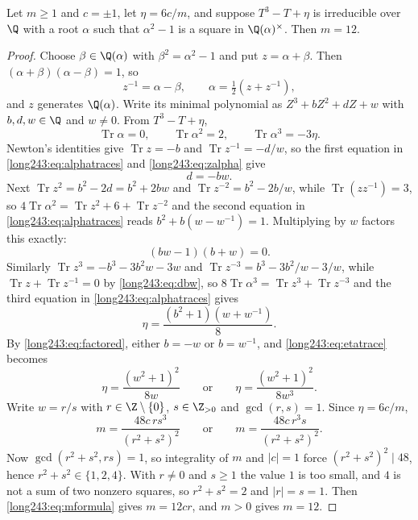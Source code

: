 \documentclass[11pt]{article}
\DeclareMathOperator{\Tr}{Tr}
\begin{document}
\begin{lemma}\label{long243:res:scaletwelve}
Let $m\ge1$ and $c=\pm1$, let $\eta=6c/m$, and suppose $T^3-T+\eta$ is
irreducible over $\Q$ with a root $\alpha$ such that $\alpha^2-1$ is a square
in $\Q(\alpha)^\times$.  Then $m=12$.
\end{lemma}

\begin{proof}
Choose $\beta\in\Q(\alpha)$ with $\beta^2=\alpha^2-1$ and put $z=\alpha+\beta$.
Then $(\alpha+\beta)(\alpha-\beta)=1$, so
\begin{equation}\label{long243:eq:zalpha}
 z^{-1}=\alpha-\beta,\qquad \alpha=\tfrac12(z+z^{-1}),
\end{equation}
and $z$ generates $\Q(\alpha)$.  Write its minimal polynomial as
$Z^3+bZ^2+dZ+w$ with $b,d,w\in\Q$ and $w\ne0$.  From $T^3-T+\eta$,
\begin{equation}\label{long243:eq:alphatraces}
 \Tr\alpha=0,\qquad \Tr\alpha^2=2,\qquad \Tr\alpha^3=-3\eta .
\end{equation}
Newton's identities give $\Tr z=-b$ and $\Tr z^{-1}=-d/w$, so the first
equation in \eqref{long243:eq:alphatraces} and \eqref{long243:eq:zalpha} give
\begin{equation}\label{long243:eq:dbw}
 d=-bw .
\end{equation}
Next $\Tr z^2=b^2-2d=b^2+2bw$ and $\Tr z^{-2}=b^2-2b/w$, while
$\Tr(zz^{-1})=3$, so $4\Tr\alpha^2=\Tr z^2+6+\Tr z^{-2}$ and the second
equation in \eqref{long243:eq:alphatraces} reads $b^2+b(w-w^{-1})=1$.  Multiplying by
$w$ factors this exactly:
\begin{equation}\label{long243:eq:factored}
 (bw-1)(b+w)=0 .
\end{equation}
Similarly $\Tr z^3=-b^3-3b^2w-3w$ and $\Tr z^{-3}=b^3-3b^2/w-3/w$, while
$\Tr z+\Tr z^{-1}=0$ by \eqref{long243:eq:dbw}, so
$8\Tr\alpha^3=\Tr z^3+\Tr z^{-3}$ and the third equation in
\eqref{long243:eq:alphatraces} gives
\begin{equation}\label{long243:eq:etatrace}
 \eta=\frac{(b^2+1)(w+w^{-1})}8 .
\end{equation}
By \eqref{long243:eq:factored}, either $b=-w$ or $b=w^{-1}$, and \eqref{long243:eq:etatrace}
becomes
\[
 \eta=\frac{(w^2+1)^2}{8w}
 \qquad\text{or}\qquad
 \eta=\frac{(w^2+1)^2}{8w^3}.
\]
Write $w=r/s$ with $r\in\Z\mathbin{\backslash}\{0\}$, $s\in\Z_{>0}$ and $\gcd(r,s)=1$.
Since $\eta=6c/m$,
\begin{equation}\label{long243:eq:mformula}
 m=\frac{48c\,rs^3}{(r^2+s^2)^2}
 \qquad\text{or}\qquad
 m=\frac{48c\,r^3s}{(r^2+s^2)^2}.
\end{equation}
Now $\gcd(r^2+s^2,rs)=1$, so integrality of $m$ and $|c|=1$ force
$(r^2+s^2)^2\mid48$, hence $r^2+s^2\in\{1,2,4\}$.  With $r\ne0$ and $s\ge1$ the
value $1$ is too small, and $4$ is not a sum of two nonzero squares, so
$r^2+s^2=2$ and $|r|=s=1$.  Then \eqref{long243:eq:mformula} gives $m=12cr$, and
$m>0$ gives $m=12$.
\end{proof}
\end{document}
